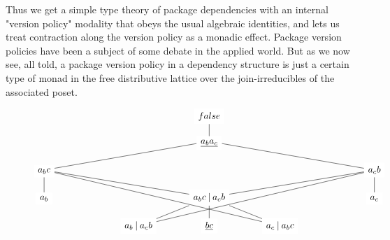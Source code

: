 \documentclass[hoptionsi,review,format=acmsmall]{acmart}
\theoremstyle{definition}
\newcommand{\bor}{\mathbin{|}}
\begin{document}
Thus we get a simple type theory of package dependencies with an internal "version policy" modality that obeys the usual algebraic identities, and lets us treat contraction along the version policy as a monadic effect. Package version policies have been a subject of some debate in the applied world. But as we now see, all told, a package version policy in a dependency structure is just a certain type of monad in the free distributive lattice over the join-irreducibles of the associated poset.


\begin{figure}
\begin{equation*}
\begin{tikzcd}[row sep=scriptsize, column sep=large,cells={nodes={fill=white,fill opacity=1}}]
                            &  &                                                                          & false                                                                                              &                                                                          &  &                             \\
                            &  &                                                                          & \underline{a_b a_c} \arrow[u, no head]                                                                         &                                                                          &  &                             \\
a_b c \arrow[rrru, no head] &  &                                                                          &                                                                                                    &                                                                          &  & a_c b \arrow[lllu, no head] \\
a_b \arrow[u, no head]      &  &                                                                          & a_b c \bor a_c b \arrow[lllu, no head] \arrow[rrru, no head]                                       &                                                                          &  & a_c \arrow[u, no head]      \\
                            &  & a_b \bor a_c b \arrow[ru, no head] \arrow[rrrruu, no head]               & \underline{bc} \arrow[u, no head]                                                                              & a_c \bor a_b c \arrow[lu, no head] \arrow[lllluu, no head]               &  &                             \\[10pt]

\end{tikzcd}
\end{equation*}
\end{figure}
\end{document}

